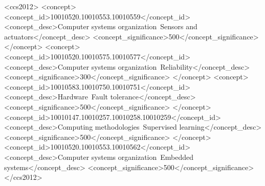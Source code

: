 


\begin{CCSXML}
	<ccs2012>
	<concept>
	<concept_id>10010520.10010553.10010559</concept_id>
	<concept_desc>Computer systems organization~Sensors and actuators</concept_desc>
	<concept_significance>500</concept_significance>
	</concept>
	<concept>
	<concept_id>10010520.10010575.10010577</concept_id>
	<concept_desc>Computer systems organization~Reliability</concept_desc>
	<concept_significance>300</concept_significance>
	</concept>
	<concept>
	<concept_id>10010583.10010750.10010751</concept_id>
	<concept_desc>Hardware~Fault tolerance</concept_desc>
	<concept_significance>500</concept_significance>
	</concept>
   <concept_id>10010147.10010257.10010258.10010259</concept_id>
   <concept_desc>Computing methodologies~Supervised learning</concept_desc>
   <concept_significance>500</concept_significance>
   </concept>
   <concept_id>10010520.10010553.10010562</concept_id>
<concept_desc>Computer systems organization~Embedded systems</concept_desc>
<concept_significance>500</concept_significance>
   	</ccs2012>
\end{CCSXML}

